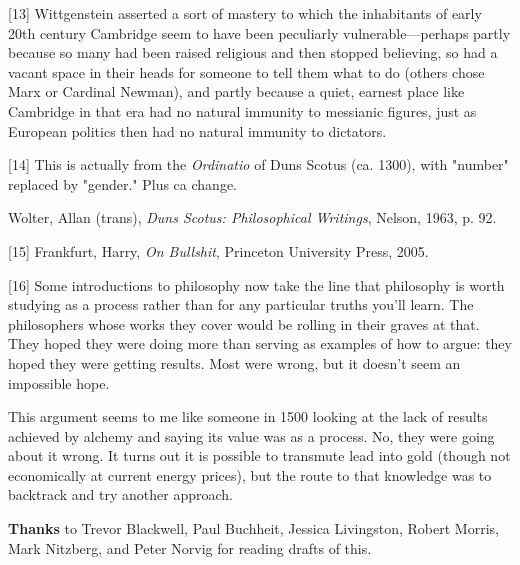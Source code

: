 [13] Wittgenstein asserted a sort of mastery to which the
                  inhabitants of early 20th century Cambridge seem to have been
                  peculiarly vulnerable---perhaps partly because so many had
                  been raised religious and then stopped believing, so had a
                  vacant space in their heads for someone to tell them what to
                  do (others chose Marx or Cardinal Newman), and partly because
                  a quiet, earnest place like Cambridge in that era had no
                  natural immunity to messianic figures, just as European
                  politics then had no natural immunity to dictators.

[14] This is actually from the \emph{Ordinatio} of Duns Scotus
                  (ca. 1300), with "number" replaced by "gender." Plus ca
                  change.

Wolter, Allan (trans),
                  \emph{Duns Scotus: Philosophical Writings}, Nelson, 1963, p.
                  92.

[15] Frankfurt, Harry, \emph{On Bullshit}, Princeton University
                  Press, 2005.

[16] Some introductions to philosophy now take the line that
                  philosophy is worth studying as a process rather than for any
                  particular truths you'll learn. The philosophers whose works
                  they cover would be rolling in their graves at that. They
                  hoped they were doing more than serving as examples of how to
                  argue: they hoped they were getting results. Most were wrong,
                  but it doesn't seem an impossible hope.

This
                  argument seems to me like someone in 1500 looking at the lack
                  of results achieved by alchemy and saying its value was as a
                  process. No, they were going about it wrong. It turns out it
                  is possible to transmute lead into gold (though not
                  economically at current energy prices), but the route to that
                  knowledge was to backtrack and try another approach.

\textbf{Thanks}
                  to Trevor Blackwell, Paul Buchheit, Jessica Livingston, Robert
                  Morris, Mark Nitzberg, and Peter Norvig for reading drafts of
                  this.



              
            
          
